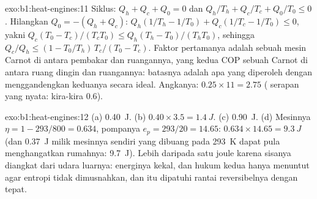 \begin{solution}{exo:b1:heat-engines:11}
Siklus: $Q_h + Q_c + Q_0 = 0$ dan $Q_h/T_h + Q_c/T_c + Q_0/T_0 \leq 0$.
Hilangkan $Q_0 = -(Q_h + Q_c)$: $Q_h(1/T_h - 1/T_0) + Q_c(1/T_c - 1/T_0) \leq 0$,
yakni $Q_c(T_0 - T_c)/(T_cT_0) \leq Q_h(T_h - T_0)/(T_hT_0)$, sehingga
$Q_c/Q_h \leq (1 - T_0/T_h)\,T_c/(T_0 - T_c)$. Faktor pertamanya adalah
 sebuah mesin Carnot di antara pembakar dan ruangannya, yang kedua
COP sebuah  Carnot di antara ruang dingin dan ruangannya: batasnya adalah apa
yang diperoleh dengan menggandengkan keduanya secara ideal. Angkanya: $0.25 \times 11 = 2.75$
( serapan yang nyata: kira-kira $0.6$).
\end{solution}

\begin{solution}{exo:b1:heat-engines:12}
(a) \qty{0.40}{J}. (b) $0.40 \times 3.5 = \qty{1.4}{J}$. (c) \qty{0.90}{J}.
(d) Mesinnya $\eta = 1 - 293/800 = 0.634$, pompanya $e_p = 293/20 = 14.65$:
$0.634 \times 14.65 = \qty{9.3}{J}$ (dan \qty{0.37}{J} milik mesinnya sendiri yang
dibuang pada \qty{293}{K} dapat pula menghangatkan rumahnya: \qty{9.7}{J}). Lebih daripada
satu joule karena sisanya diangkat dari udara luarnya: energinya
kekal, dan hukum kedua hanya menuntut agar entropi tidak dimusnahkan,
dan itu dipatuhi rantai reversibelnya dengan tepat.
\end{solution}

